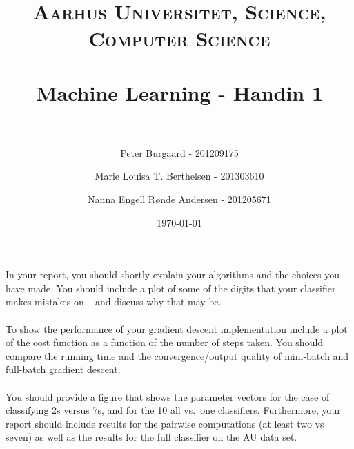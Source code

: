 \documentclass[paper=a4, fontsize=11pt]{scrartcl} %
\title{	
	\normalfont \normalsize 
	\textsc{Aarhus Universitet, Science, Computer Science} \\ [25pt] %
	\horrule{0.5pt} \\[0.4cm] %
	\huge Machine Learning - Handin 1 \\ %
	\horrule{2pt} \\[0.5cm] %
}
\author{Peter Burgaard - 201209175 \and Marie Louisa T. Berthelsen - 201303610 \and Nanna Engell Rønde Andersen - 201205671} %
\date{\normalsize\today} %
\begin{document}
\maketitle

In your report, you should shortly explain your algorithms and the choices you have made. You should include a plot of some of the digits that your classifier makes mistakes on -- and discuss why that may be. \\ \\
To show the performance of your gradient descent implementation include a plot of the cost function as a function of the number of steps taken. You should compare the running time and the convergence/output quality of mini-batch and full-batch gradient descent. \\ \\
You should provide a figure that shows the parameter vectors for the case of classifying 2s versus 7s, and for the 10 all vs.~one classifiers. Furthermore, your report should include results for the pairwise computations (at least two vs seven) as well as the results for the full classifier on the AU data set. \\ \\
\end{document}

